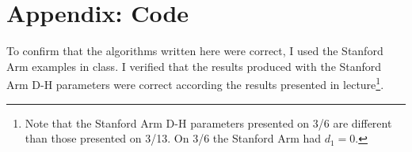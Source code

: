 \documentclass{article}
\begin{document}



\clearpage
\appendix
\section{Appendix: Code}
To confirm that the algorithms written here were correct, I used the Stanford Arm examples in class.
I verified that the results produced with the Stanford Arm D-H parameters were correct according the results presented in lecture\footnote{Note that the Stanford Arm D-H parameters presented on 3/6 are different than those presented on 3/13.
On 3/6 the Stanford Arm had $d_1=0$.}.

\end{document}

